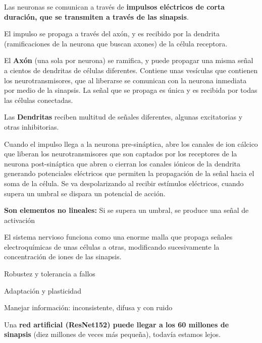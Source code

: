 \documentclass[12pt, twoside, openright]{report} %
\begin{document}
Las neuronas se comunican a través de \textbf{impulsos eléctricos de corta duración, que se transmiten a través de las sinapsis}.

El impulso se propaga a través del axón, y es recibido por la dendrita (ramificaciones de la neurona que buscan axones) de la célula receptora.

El \textbf{Axón} (una sola por neurona) se ramifica, y puede propagar una misma señal a cientos de dendritas de células diferentes. Contiene unas vesículas que contienen los neurotransmisores, que al liberarse se comunican con la neurona inmediata por medio de la sinapsis. La señal que se propaga es única y es recibida por todas las células conectadas.

Las \textbf{Dendritas} reciben multitud de señales diferentes, algunas excitatorias y otras inhibitorias.
\pagebreak

Cuando el impulso llega a la neurona pre-sináptica, abre los canales de ion cálcico que liberan los neurotransmisores que son captados por los receptores de la neurona post-sináptica que abren o cierran los canales iónicos de la dendrita generando potenciales eléctricos que permiten la propagación de la señal hacia el soma de la célula. Se va despolarizando al recibir estímulos eléctricos, cuando supera un umbral se dispara un potencial de acción.

\textbf{Son elementos no lineales:} Si se supera un umbral, se produce una señal de activación

El sistema nervioso funciona como una enorme malla que propaga señales electroquímicas de unas células a otras, modificando sucesivamente la concentración de iones de las sinapsis.

Robustez y tolerancia a fallos

Adaptación y plasticidad

Manejar información: inconsistente, difusa y con ruido

Una \textbf{red artificial (ResNet152) puede llegar a los 60 millones de sinapsis} (diez millones de veces más pequeña), todavía estamos lejos.
\end{document}
